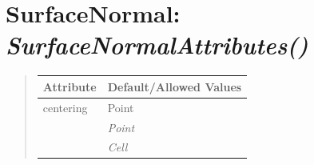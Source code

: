 \documentclass[letterpaper,10pt,english]{sphinxmanual}
\begin{document}
\begin{DUlineblock}{0em}
\item[] 
\end{DUlineblock}


\section{\textbf{SurfaceNormal}: \emph{SurfaceNormalAttributes()}}
\label{attributes:surfacenormal-surfacenormalattributes}
\begin{DUlineblock}{0em}
\item[] 
\end{DUlineblock}
\begin{quote}

\begin{tabulary}{\linewidth}{|L|L|}
\hline

\textbf{Attribute}
 & 
\textbf{Default/Allowed Values}
\\
\hline
centering
 & 
Point
\\
\hline & 
\emph{Point}
\\
\hline & 
\emph{Cell}
\\
\hline\end{tabulary}

\end{quote}

\begin{DUlineblock}{0em}
\item[] 
\end{DUlineblock}

\begin{DUlineblock}{0em}
\item[] 
\end{DUlineblock}
\end{document}
